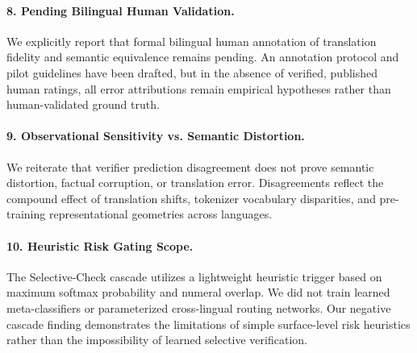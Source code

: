 \paragraph{8. Pending Bilingual Human Validation.}
We explicitly report that formal bilingual human annotation of translation fidelity and semantic equivalence remains pending. An annotation protocol and pilot guidelines have been drafted, but in the absence of verified, published human ratings, all error attributions remain empirical hypotheses rather than human-validated ground truth.

\paragraph{9. Observational Sensitivity vs. Semantic Distortion.}
We reiterate that verifier prediction disagreement does not prove semantic distortion, factual corruption, or translation error. Disagreements reflect the compound effect of translation shifts, tokenizer vocabulary disparities, and pre-training representational geometries across languages.

\paragraph{10. Heuristic Risk Gating Scope.}
The Selective-Check cascade utilizes a lightweight heuristic trigger based on maximum softmax probability and numeral overlap. We did not train learned meta-classifiers or parameterized cross-lingual routing networks. Our negative cascade finding demonstrates the limitations of simple surface-level risk heuristics rather than the impossibility of learned selective verification.
